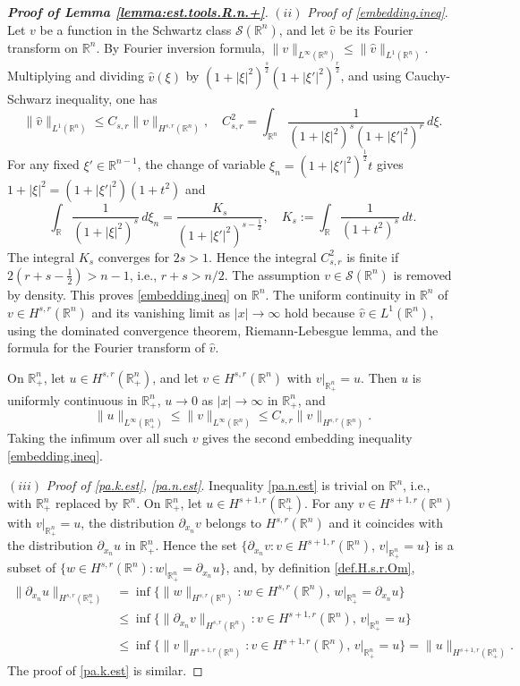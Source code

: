 \documentclass[10pt,reqno,a4paper]{article}
\numberwithin{equation}{section}
\theoremstyle{plain}
\theoremstyle{definition}
\newcommand{\R}{{\mathbb R}}
\newcommand{\mS}{\mathcal{S}}
\newcommand{\pa}{\partial}
\begin{document}
\begin{proof}[\textbf{Proof of Lemma \ref{lemma:est.tools.R.n.+}}]
$(ii)$ \emph{Proof of \eqref{embedding.ineq}}. 
Let $v$ be a function in the Schwartz class $\mS(\R^n)$, 
and let $\hat v$ be its Fourier transform on $\R^n$.  
By Fourier inversion formula,
$\| v \|_{L^\infty(\R^n)} \leq \| \hat v \|_{L^1(\R^n)}$.  
Multiplying and dividing $\hat v(\xi)$ by 
$(1 + |\xi|^2)^{\frac{s}{2}} (1 + |\xi'|^2)^{\frac{r}{2}}$, 
and using Cauchy-Schwarz inequality, 
one has  
\[
\| \hat v \|_{L^1(\R^n)} 
\leq C_{s,r} \| v \|_{H^{s,r}(\R^n)}, 
\quad  
C_{s,r}^2 = \int_{\R^n} \frac{1}{ (1 + |\xi|^2)^s (1 + |\xi'|^2)^r } \, d\xi.
\]
For any fixed $\xi' \in \R^{n-1}$, 
the change of variable $\xi_n = (1 + |\xi'|^2)^{\frac12} t$ gives
$1 + |\xi|^2 = (1 + |\xi'|^2)(1+t^2)$ and
\begin{equation} \label{int.on.R.like.arctan}
\int_\R \frac{1}{ (1 + |\xi|^2)^s } \, d \xi_n 
= \frac{ K_s }{ (1 + |\xi'|^2)^{s - \frac12} }, \quad 
K_s := \int_\R \frac{1}{(1 + t^2)^s} \, dt.
\end{equation}
The integral $K_s$ converges for $2 s > 1$. 
Hence the integral $C_{s,r}^2$ is finite if $2(r+s-\frac12) > n-1$, i.e., $r+s > n/2$.
The assumption $v \in \mS(\R^n)$ is removed by density.
This proves \eqref{embedding.ineq} on $\R^n$. 
The uniform continuity in $\R^n$ of $v \in H^{s,r}(\R^n)$ 
and its vanishing limit as $|x| \to \infty$ 
hold because $\hat v \in L^1(\R^n)$, using the dominated convergence theorem, 
Riemann-Lebesgue lemma, and the formula for the Fourier transform of $\hat v$. 

On $\R^n_+$, let $u \in H^{s,r}(\R^n_+)$, and let $v \in H^{s,r}(\R^n)$ with $v |_{\R^n_+} = u$. 
Then $u$ is uniformly continuous in $\R^n_+$, 
$u \to 0$ as $|x| \to \infty$ in $\R^n_+$, and 
\[
\| u \|_{L^\infty(\R^n_+)} 
\leq \| v \|_{L^\infty(\R^n)} 
\leq C_{s,r} \| v \|_{H^{s,r}(\R^n)}.
\]
Taking the infimum over all such $v$ 
gives the second embedding inequality \eqref{embedding.ineq}. 

\medskip

$(iii)$ \emph{Proof of \eqref{pa.k.est}, \eqref{pa.n.est}}. 
Inequality \eqref{pa.n.est} is trivial on $\R^n$, i.e., with $\R^n_+$ replaced by $\R^n$. 
On $\R^n_+$, let $u \in H^{s+1,r}(\R^n_+)$. 
For any $v \in H^{s+1,r}(\R^n)$ with $v|_{\R^n_+} = u$, 
the distribution $\pa_{x_n} v$ belongs to $H^{s,r}(\R^n)$
and it coincides with the distribution $\pa_{x_n} u$ in $\R^n_+$. 
Hence the set $\{ \pa_{x_n} v : v \in H^{s+1,r}(\R^n)$, $v|_{\R^n_+} = u \}$  
is a subset of $\{ w \in H^{s,r}(\R^n) : w|_{\R^n_+} = \pa_{x_n} u \}$,
and, by definition \eqref{def.H.s.r.Om},
\begin{align*}
\| \pa_{x_n} u \|_{H^{s,r}(\R^n_+)} 
& = \inf \{ \| w \|_{H^{s,r}(\R^n)} : w \in H^{s,r}(\R^n), \,  w|_{\R^n_+} = \pa_{x_n} u \}
\\ 
& \leq \inf \{ \| \pa_{x_n} v \|_{H^{s,r}(\R^n)} : v \in H^{s+1,r}(\R^n), \, v|_{\R^n_+} = u \}  
\\ 
& \leq \inf \{ \| v \|_{H^{s+1,r}(\R^n)} : v \in H^{s+1,r}(\R^n), \, v|_{\R^n_+} = u \}
= \| u \|_{H^{s+1,r}(\R^n_+)}.  
\end{align*} 
The proof of \eqref{pa.k.est} is similar.


\end{proof}
\end{document}
